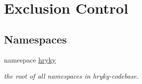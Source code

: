 \hypertarget{group__exclusion__control}{\section{Exclusion Control}
\label{group__exclusion__control}
}
\subsection*{Namespaces}
\begin{DoxyCompactItemize}
\item 
namespace \hyperlink{namespacehryky}{hryky}
\begin{DoxyCompactList}\small\item\em the root of all namespaces in hryky-\/codebase. \end{DoxyCompactList}\end{DoxyCompactItemize}
